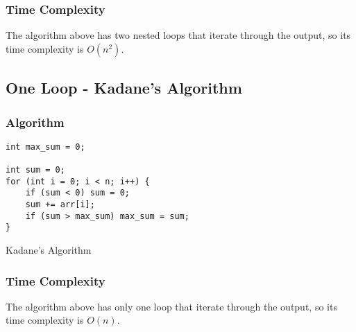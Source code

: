 \documentclass[12pt, a4paper]{article}
\begin{document}
\subsubsection{Time Complexity}

The algorithm above has two nested loops that iterate through the output, so
its time complexity is $O(n^2)$.

\newpage

\subsection{One Loop - Kadane's Algorithm}

\subsubsection{Algorithm}

\begin{listing}[!ht]
\begin{verbatim}
int max_sum = 0;

int sum = 0;
for (int i = 0; i < n; i++) {
    if (sum < 0) sum = 0;
    sum += arr[i];
    if (sum > max_sum) max_sum = sum;
}
\end{verbatim}
\caption{Kadane's Algorithm}
\label{listing:alg-one-loop}
\end{listing}

\subsubsection{Time Complexity}

The algorithm above has only one loop that iterate through the output, so its
time complexity is $O(n)$.
\end{document}
